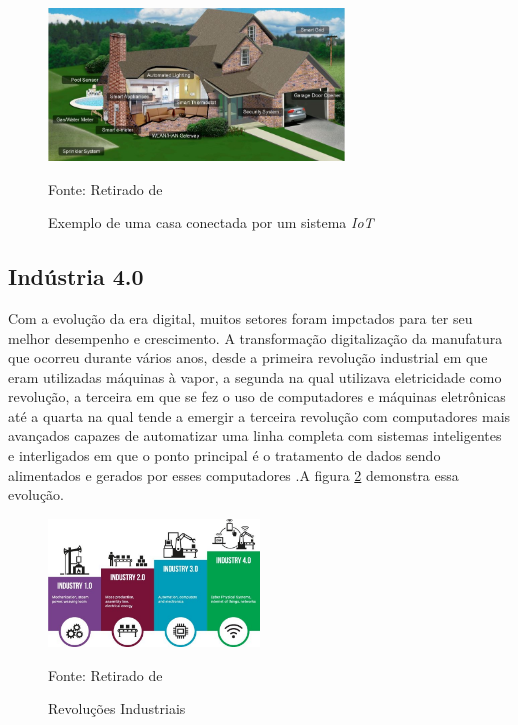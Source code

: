 \documentclass[../../layout.tex]{subfiles}
\begin{document}
\begin{figure}[H]
\centering
\caption{Exemplo de uma casa conectada por um sistema \emph{IoT}}
\includegraphics[width=0.7\textwidth]{assets/static/img/iothouse.jpg}
\label{fig:iothou}

\begin{minipage}{0.5\textwidth}
\raggedright \footnotesize Fonte: Retirado de \cite{iothouse} 
\end{minipage}
\end{figure}

\subsection{Indústria 4.0}

\hspace*{3em}Com a evolução da era digital, muitos setores foram impctados para ter seu melhor desempenho e crescimento. A transformação digitalização da manufatura que ocorreu durante vários anos, desde a primeira revolução industrial em que eram utilizadas máquinas à vapor, a segunda na qual utilizava eletricidade como revolução, a terceira em que se fez o uso de computadores e máquinas eletrônicas até a quarta na qual tende a emergir a terceira revolução com computadores mais avançados capazes de automatizar uma linha completa com sistemas inteligentes e interligados em que o ponto principal é o tratamento de dados sendo alimentados e gerados por esses computadores \cite{ind4}.A figura \ref{fig:ind} demonstra essa evolução.

\begin{figure}[H]
\centering
\caption{Revoluções Industriais}
\includegraphics[width=0.5\textwidth]{assets/static/img/ind4.jpg}
\label{fig:ind}

\begin{minipage}{0.7\textwidth}
\raggedright \footnotesize Fonte: Retirado de \cite{ind4} 
\end{minipage}
\end{figure}
\end{document}
